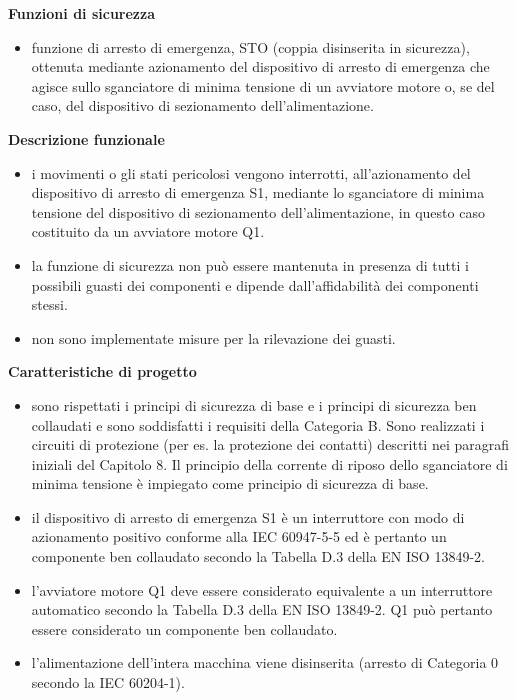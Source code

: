 \textbf{Funzioni di sicurezza}
\begin{itemize}
    \item funzione di arresto di emergenza, STO (coppia disinserita in sicurezza), ottenuta mediante azionamento del dispositivo di arresto di emergenza che agisce sullo sganciatore di minima tensione di un avviatore motore o, se del caso, del dispositivo di sezionamento dell'alimentazione.
\end{itemize}

\textbf{Descrizione funzionale}
\begin{itemize}
    \item i movimenti o gli stati pericolosi vengono interrotti, all'azionamento del dispositivo di arresto di emergenza S1, mediante lo sganciatore di minima tensione del dispositivo di sezionamento dell'alimentazione, in questo caso costituito da un avviatore motore Q1.
    \item la funzione di sicurezza non può essere mantenuta in presenza di tutti i possibili guasti dei componenti e dipende dall'affidabilità dei componenti stessi.
    \item non sono implementate misure per la rilevazione dei guasti.
\end{itemize}

\textbf{Caratteristiche di progetto}
\begin{itemize}
    \item sono rispettati i principi di sicurezza di base e i principi di sicurezza ben collaudati e sono soddisfatti i requisiti della Categoria B. Sono realizzati i circuiti di protezione (per es. la protezione dei contatti) descritti nei paragrafi iniziali del Capitolo 8. Il principio della corrente di riposo dello sganciatore di minima tensione è impiegato come principio di sicurezza di base.
    \item il dispositivo di arresto di emergenza S1 è un interruttore con modo di azionamento positivo conforme alla IEC 60947-5-5 ed è pertanto un componente ben collaudato secondo la Tabella D.3 della EN ISO 13849-2.
    \item l'avviatore motore Q1 deve essere considerato equivalente a un interruttore automatico secondo la Tabella D.3 della EN ISO 13849-2. Q1 può pertanto essere considerato un componente ben collaudato.
    \item l'alimentazione dell'intera macchina viene disinserita (arresto di Categoria 0 secondo la IEC 60204-1).
\end{itemize}

